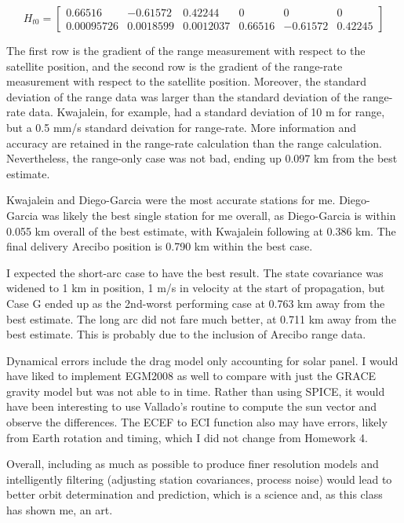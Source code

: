 \documentclass[conf]{new-aiaa}
\begin{document}
\begin{equation}
	H_{t0} = 
	\begin{bmatrix}
		0.66516   &  -0.61572 &     0.42244    &   0 &	0  &          0 \\		      
		0.00095726  &  0.0018599  &  0.0012037   &   0.66516 &
		-0.61572    &  0.42245
	\end{bmatrix}
\end{equation}

The first row is the gradient of the range measurement with respect to the satellite position, and the second row is the gradient of the range-rate measurement with respect to the satellite position. Moreover, the standard deviation of the range data was larger than the standard deviation of the range-rate data. Kwajalein, for example, had a standard deviation of 10 m for range, but a 0.5 mm/s standard deivation for range-rate. More information and accuracy are retained in the range-rate calculation than the range calculation. Nevertheless, the range-only case was not bad, ending up 0.097 km from the best estimate. 

Kwajalein and Diego-Garcia were the most accurate stations for me. Diego-Garcia was likely the best single station for me overall, as Diego-Garcia is within 0.055 km overall of the best estimate, with Kwajalein following at 0.386 km. The final delivery Arecibo position is 0.790 km within the best case. 

I expected the short-arc case to have the best result. The state covariance was widened to 1 km in position, 1 m/s in velocity at the start of propagation, but Case G ended up as the 2nd-worst performing case at 0.763 km away from the best estimate. The long arc did not fare much better, at 0.711 km away from the best estimate. This is probably due to the inclusion of Arecibo range data. 

Dynamical errors include the drag model only accounting for solar panel. I would have liked to implement EGM2008 as well to compare with just the GRACE gravity model but was not able to in time. Rather than using SPICE, it would have been interesting to use Vallado's routine to compute the sun vector and observe the differences. The ECEF to ECI function also may have errors, likely from Earth rotation and timing, which I did not change from Homework 4. 

Overall, including as much as possible to produce finer resolution models and intelligently filtering (adjusting station covariances, process noise) would lead to better orbit determination and prediction, which is a science and, as this class has shown me, an art. 
\end{document}
